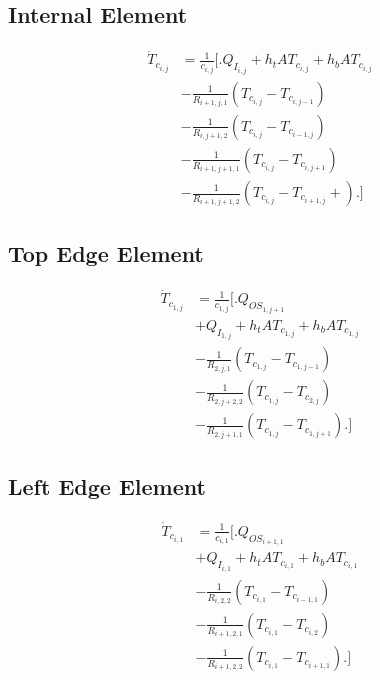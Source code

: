 \documentclass[10pt,twocolumn]{article}
\begin{document}
\subsection{Internal Element}
\begin{equation}
\begin{split}
\dot{T}_{c_{i,j}} 	& = \frac{1}{c_{i,j}}
					\Biggl[\Biggr.
					 	Q_{I_{i,j}} + h_{t}AT_{c_{i,j}} + h_{b}AT_{c_{i,j}} \\					
					&	- \frac{1}{R_{i+1,j,1}}\left(T_{c_{i,j}}- T_{c_{i,j-1}}\right) \\
					& 	- \frac{1}{R_{i,j+1,2}}\left(T_{c_{i,j}}- T_{c_{i-1,j}}\right) \\
					& 	- \frac{1}{R_{i+1,j+1,1}}\left(T_{c_{i,j}}- T_{c_{i,j+1}}\right) \\
					& 	- \frac{1}{R_{i+1,j+1,2}}\left(T_{c_{i,j}}- T_{c_{i+1,j}} + \right)
					\Biggl.\Biggl]
\end{split}
\end{equation}

\subsection{Top Edge Element}
\begin{equation}
\begin{split}
\dot{T}_{c_{1,j}}	& = \frac{1}{c_{1,j}}
					\Biggl[\Biggr.
					 	   Q_{OS_{1,j+1}} \\
					&	 + Q_{I_{1,j}}+ h_{t}AT_{c_{1,j}} + h_{b}AT_{c_{1,j}} \\
					&	- \frac{1}{R_{2,j,1}}\left(T_{c_{1,j}}- T_{c_{1,j-1}}\right) \\
					& 	- \frac{1}{R_{2,j+2,2}}\left(T_{c_{1,j}}- T_{c_{2,j}}\right) \\
					& 	- \frac{1}{R_{2,j+1,1}}\left(T_{c_{1,j}}- T_{c_{1,j+1}}\right)
					\Biggl.\Biggr]
\end{split}
\end{equation}

\subsection{Left Edge Element}
\begin{equation}
\begin{split}
\dot{T}_{c_{i,1}}	& = \frac{1}{c_{i,1}}
					\Biggl[\Biggr.
					 	  Q_{OS_{i+1,1}} \\
					&	+ Q_{I_{i,1}}+ h_{t}AT_{c_{i,1}} + h_{b}AT_{c_{i,1}} \\
					&	- \frac{1}{R_{i,2,2}}\left(T_{c_{i,1}}- T_{c_{i-1,1}}\right) \\
					& 	- \frac{1}{R_{i+1,2,1}}\left(T_{c_{i,1}}- T_{c_{i,2}}\right) \\
					& 	- \frac{1}{R_{i+1,2,2}}\left(T_{c_{i,1}}- T_{c_{i+1,1}}\right)
					\Biggl.\Biggr]
\end{split}
\end{equation}
\end{document}
